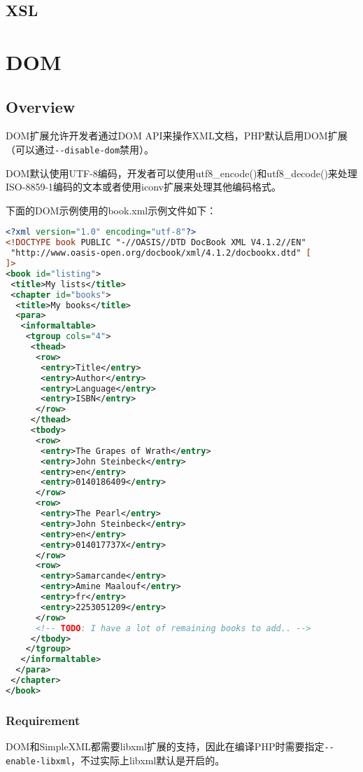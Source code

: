 \section{XSL}


\chapter{DOM}

\section{Overview}


DOM扩展允许开发者通过DOM API来操作XML文档，PHP默认启用DOM扩展（可以通过\texttt{-\/-disable-dom}禁用）。

DOM默认使用UTF-8编码，开发者可以使用utf8\_encode()和utf8\_decode()来处理ISO-8859-1编码的文本或者使用iconv扩展来处理其他编码格式。

下面的DOM示例使用的book.xml示例文件如下：

\begin{lstlisting}[language=XML]
<?xml version="1.0" encoding="utf-8"?>
<!DOCTYPE book PUBLIC "-//OASIS//DTD DocBook XML V4.1.2//EN"
 "http://www.oasis-open.org/docbook/xml/4.1.2/docbookx.dtd" [
]>
<book id="listing">
 <title>My lists</title>
 <chapter id="books">
  <title>My books</title>
  <para>
   <informaltable>
    <tgroup cols="4">
     <thead>
      <row>
       <entry>Title</entry>
       <entry>Author</entry>
       <entry>Language</entry>
       <entry>ISBN</entry>
      </row>
     </thead>
     <tbody>
      <row>
       <entry>The Grapes of Wrath</entry>
       <entry>John Steinbeck</entry>
       <entry>en</entry>
       <entry>0140186409</entry>
      </row>
      <row>
       <entry>The Pearl</entry>
       <entry>John Steinbeck</entry>
       <entry>en</entry>
       <entry>014017737X</entry>
      </row>
      <row>
       <entry>Samarcande</entry>
       <entry>Amine Maalouf</entry>
       <entry>fr</entry>
       <entry>2253051209</entry>
      </row>
      <!-- TODO: I have a lot of remaining books to add.. -->
     </tbody>
    </tgroup>
   </informaltable>
  </para>
 </chapter>
</book>
\end{lstlisting}


\subsection{Requirement}

DOM和SimpleXML都需要libxml扩展的支持，因此在编译PHP时需要指定\texttt{-\/-enable-libxml}，不过实际上libxml默认是开启的。

